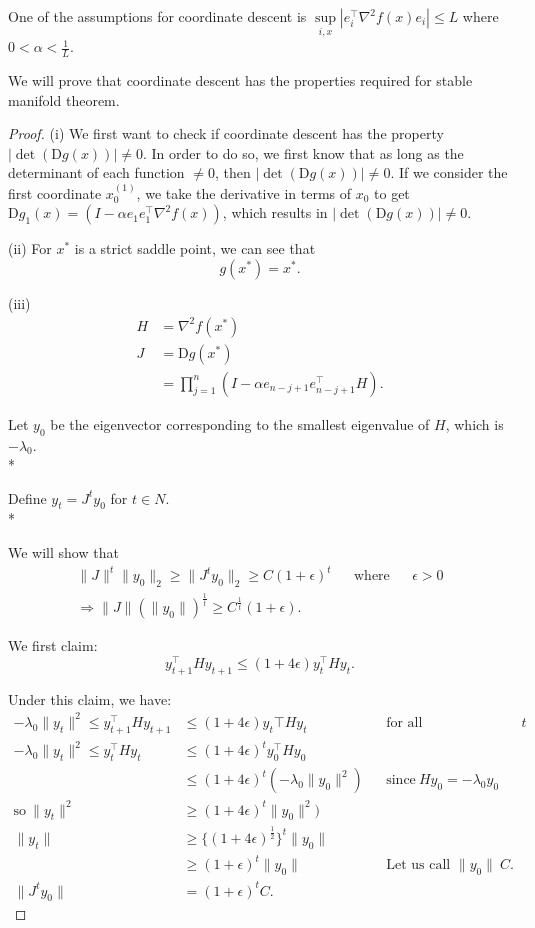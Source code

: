 \documentclass[twoside]{article}
\theoremstyle{definition}
\theoremstyle{definition}
\theoremstyle{remark}
\begin{document}
One of the assumptions for coordinate descent is $\sup \limits_{i,x} | e_i^\top \nabla^2 f(x) e_i | \leq L$ where $0 < \alpha < \frac{1}{L}$.

We will prove that coordinate descent has the properties required for stable manifold theorem.

\begin{proof}

(i) We first want to check if coordinate descent has the property $| \det(\text{D}g(x)) | \neq 0$.
In order to do so, we first know that as long as the determinant of each function $\neq 0 $, then $| \det(\text{D}g(x)) | \neq 0$. If we consider the first coordinate $x_0^{(1)}$, we take the derivative in terms of $x_0$ to get $\text{D}g_1(x) = (I - \alpha e_1 e_1^\top \nabla^2 f(x))$, which results in $| \det(\text{D}g(x)) | \neq 0$.

(ii)
For $x^*$ is a strict saddle point, we can see that
$$g(x^*) = x^*.$$

(iii)
\[
\begin{aligned}
H &= \nabla^2 f(x^*) \\
J &= \text{D}g(x^*) \\
&= \prod \limits_{j=1}^n (I - \alpha e_{n-j+1} e_{n-j+1}^\top H).
\end{aligned}
\]

Let $y_0$ be the eigenvector corresponding to the smallest eigenvalue of $H$, which is $-\lambda_0$. \\*

Define $y_t =  J^t y_0$ for $t \in N$. \\*

We will show that
\[
\begin{aligned}
\| J \|^t \| y_0 \|_2 \geq \|J^t y_0 \|_2 \geq C(1+\epsilon)^t && \text{where} && \epsilon > 0 \\
\Rightarrow \| J \| (\| y_0 \|)^{\frac{1}{t}} \geq C^{\frac{1}{t}} (1 + \epsilon).
\end{aligned}
\]

We first claim:
$$ y_{t+1}^\top H y_{t+1} \leq (1 + 4\epsilon) y_t^\top H y_t.$$

Under this claim, we have:
\[
\begin{aligned}
-\lambda_0 \| y_t \|^2 \leq y_{t+1}^\top H y_{t+1} &\leq (1 + 4\epsilon)y_t\top H y_t  && \text{for all} && t \\
-\lambda_0 \| y_t \|^2 \leq y_t^\top H y_t &\leq (1 + 4 \epsilon)^t y_0^\top H y_0 \\
&\leq (1 + 4 \epsilon)^t (-\lambda_0 \| y_0 \|^2) && \text{since} \ Hy_0 = - \lambda_0 y_0 \\
\text{so} \ \|y_t\|^2 &\geq (1 + 4 \epsilon)^t \| y_0 \|^2) \\
\| y_t \| &\geq \{(1 + 4 \epsilon)^{\frac{1}{2}}\}^t \| y_0 \| \\
&\geq (1 + \epsilon)^t \| y_0 \| && \text{Let us call } \| y_0 \| \ C. \\
\| J^t y_0 \| &= (1 + \epsilon)^t C.
\end{aligned}
\]


\end{proof}
\end{document}

